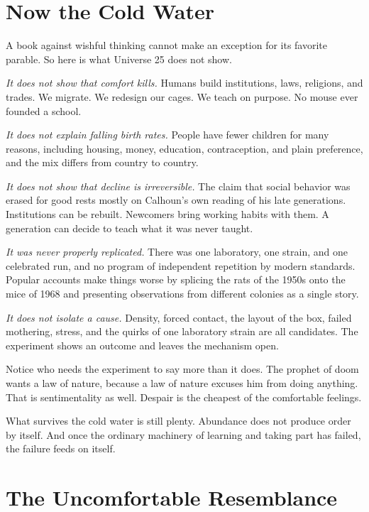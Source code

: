 \documentclass[12pt,a4paper]{book}
\begin{document}
\section{Now the Cold Water}

A book against wishful thinking cannot make an exception for its favorite parable. So here is what Universe 25 does not show.

\emph{It does not show that comfort kills.} Humans build institutions, laws, religions, and trades. We migrate. We redesign our cages. We teach on purpose. No mouse ever founded a school.

\emph{It does not explain falling birth rates.} People have fewer children for many reasons, including housing, money, education, contraception, and plain preference, and the mix differs from country to country.

\emph{It does not show that decline is irreversible.} The claim that social behavior was erased for good rests mostly on Calhoun's own reading of his late generations. Institutions can be rebuilt. Newcomers bring working habits with them. A generation can decide to teach what it was never taught.

\emph{It was never properly replicated.} There was one laboratory, one strain, and one celebrated run, and no program of independent repetition by modern standards. Popular accounts make things worse by splicing the rats of the 1950s onto the mice of 1968 and presenting observations from different colonies as a single story.

\emph{It does not isolate a cause.} Density, forced contact, the layout of the box, failed mothering, stress, and the quirks of one laboratory strain are all candidates. The experiment shows an outcome and leaves the mechanism open.

Notice who needs the experiment to say more than it does. The prophet of doom wants a law of nature, because a law of nature excuses him from doing anything. That is sentimentality as well. Despair is the cheapest of the comfortable feelings.

What survives the cold water is still plenty. Abundance does not produce order by itself. And once the ordinary machinery of learning and taking part has failed, the failure feeds on itself.

\section{The Uncomfortable Resemblance}
\end{document}
